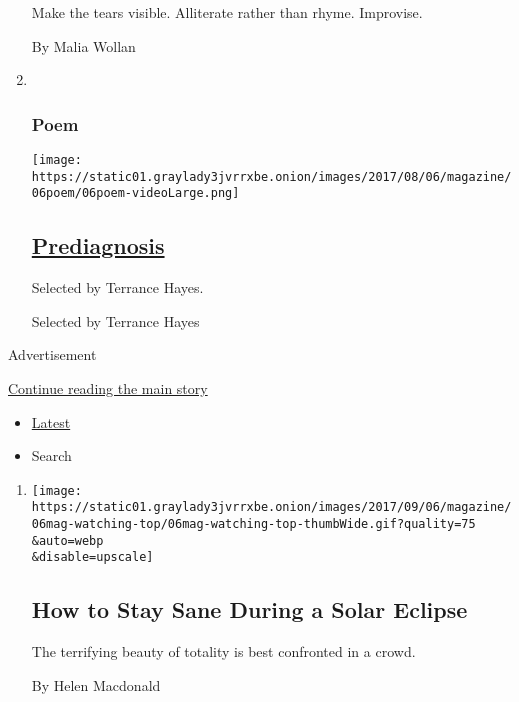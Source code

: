 \begin{enumerate}
  Make the tears visible. Alliterate rather than rhyme. Improvise.

  By Malia Wollan
\item ~
  \hypertarget{poem}{%
  \subsubsection{Poem}\label{poem}}

  \texttt{[image: https://static01.graylady3jvrrxbe.onion/images/2017/08/06/magazine/06poem/06poem-videoLarge.png]}

  \hypertarget{prediagnosis}{%
  \subsection{\texorpdfstring{\href{/2017/08/04/magazine/prediagnosis.html}{Prediagnosis}}{Prediagnosis}}\label{prediagnosis}}

  Selected by Terrance Hayes.

  Selected by Terrance Hayes
\end{enumerate}

Advertisement

\protect\hyperlink{after-mid1}{Continue reading the main story}

\begin{itemize}
\tightlist
\item
  \protect\hyperlink{stream-panel}{Latest}
\item
  Search
\end{itemize}

\begin{enumerate}
\def\labelenumi{\arabic{enumi}.}
\item
  \href{/2017/08/18/magazine/how-to-stay-sane-during-a-solar-eclipse.html}{}

  \texttt{[image: https://static01.graylady3jvrrxbe.onion/images/2017/09/06/magazine/06mag-watching-top/06mag-watching-top-thumbWide.gif?quality=75\\\&auto=webp\\\&disable=upscale]}

  \hypertarget{how-to-stay-sane-during-a-solar-eclipse}{%
  \subsection{How to Stay Sane During a Solar
  Eclipse}\label{how-to-stay-sane-during-a-solar-eclipse}}

  The terrifying beauty of totality is best confronted in a crowd.

  By Helen Macdonald
\end{enumerate}

